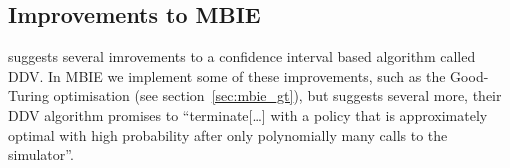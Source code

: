 \subsection{Improvements to MBIE}

\textcite{dietterich2013pac} suggests several imrovements to a confidence interval based algorithm called DDV. In MBIE we implement some of these improvements, such as the Good-Turing optimisation (see section~\ref{sec:mbie_gt}), but \textcite{dietterich2013pac} suggests several more, their DDV algorithm promises to ``terminate[\ldots] with a policy that is approximately optimal with high probability after only polynomially many calls to the simulator''.
